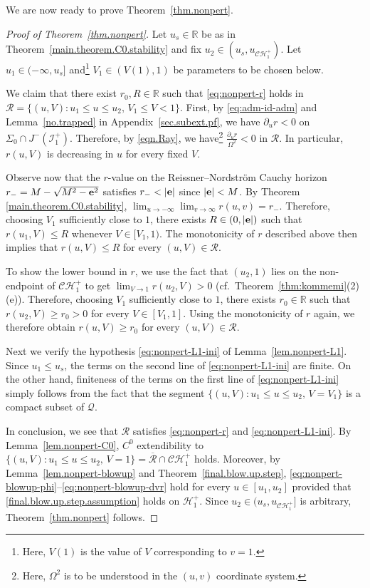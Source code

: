 \documentclass[10pt, reqno]{amsart}
\theoremstyle{definition}
\theoremstyle{remark}
\numberwithin{equation}{section}
\newcommand{\set}[1]{\{#1\}}
\newcommand{\rd}{\partial}
\newcommand{\0}{\emptyset}
\newcommand{\Omg}{\Omega}
\newcommand{\bbR}{\mathbb R}
\newcommand{\calC}{\mathcal C}
\newcommand{\calH}{\mathcal H}
\newcommand{\calQ}{\mathcal Q}
\newcommand{\calR}{\mathcal R}
\newcommand{\f}{\frac}
\newcommand{\CH}{\calC \calH^{+}}		%
\newcommand{\EH}{\calH^{+}}
\begin{document}
We are now ready to prove Theorem~\ref{thm.nonpert}.
\begin{proof}[Proof of Theorem~\ref{thm.nonpert}]
Let $u_{s} \in \bbR$ be as in Theorem~\ref{main.theorem.C0.stability} and fix $u_{2} \in (u_{s}, u_{\CH_{1}})$. Let $u_{1} \in (-\infty, u_{s}]$ and\footnote{Here, $V(1)$ is the value of $V$ corresponding to $v=1$.} $V_{1} \in (V(1), 1)$ be parameters to be chosen below. 

We claim that there exist $r_0, R\in \mathbb R$ such that \eqref{eq:nonpert-r} holds in $\mathcal R = \set{(u, V) : u_{1} \leq u \leq u_{2}, \, V_{1} \leq V < 1}$. First, by \eqref{eq:adm-id-adm} and Lemma~\ref{no.trapped} in Appendix~\ref{sec.subext.pf}, we have ${\rd_u r}<0$ on $\Sigma_0\cap J^-(\mathcal I^+_1)$. Therefore, by \eqref{eqn.Ray}, we have\footnote{Here, $\Omg^2$ is to be understood in the $(u,v)$ coordinate system.} $\f{\rd_u r}{\Omg^2}<0$ in $\mathcal R$. In particular, $r(u,V)$ is decreasing in $u$ for every fixed $V$. 

Observe now that the $r$-value on the Reissner--Nordstr\"om Cauchy horizon $r_-=M-\sqrt{M^2-{\bf e}^2}$ satisfies $r_-<|{\bf e}|$ since $|{\bf e}|<M$. 
By Theorem \ref{main.theorem.C0.stability}, $\lim_{u\to -\infty}\lim_{v\to \infty} r(u,v)= r_-$. Therefore, choosing $V_{1}$ sufficiently close to $1$, there exists $R\in (0,|{\bf e}|)$ such that $r(u_1,V)\leq R$ whenever $V \in [V_{1}, 1)$. The monotonicity of $r$ described above then implies that $r(u, V)\leq R$ for every $(u, V)\in \mathcal R$.

To show the lower bound in $r$, we use the fact that $(u_{2}, 1)$ lies on the non-endpoint of $\CH_{1}$ to get $\lim_{V \to 1} r(u_2,V)>0$ (cf.~Theorem~\ref{thm:kommemi}(2)(e)). Therefore, choosing $V_1$ sufficiently close to $1$, there exists $r_0 \in \mathbb R$ such that $r(u_2, V)\geq r_0 >0$ for every $V \in [V_1, 1]$. Using the monotonicity of $r$ again, we therefore obtain $r(u,V)\geq r_0$ for every $(u, V)\in \mathcal R$.

Next we verify the hypothesis \eqref{eq:nonpert-L1-ini} of Lemma~\ref{lem.nonpert-L1}. Since $u_{1} \leq u_{s}$, the terms on the second line of \eqref{eq:nonpert-L1-ini} are finite. On the other hand, finiteness of the terms on the first line of \eqref{eq:nonpert-L1-ini} simply follows from the fact that the segment $\set{(u, V) : u_{1} \leq u \leq u_{2}, \, V = V_{1}}$ is a compact subset of $\calQ$.

In conclusion, we see that $\calR$ satisfies \eqref{eq:nonpert-r} and \eqref{eq:nonpert-L1-ini}. By Lemma~\ref{lem.nonpert-C0}, $C^{0}$ extendibility to $\set{(u, V) : u_{1} \leq u \leq u_{2}, \, V = 1} = \overline{\calR} \cap \CH_{1}$ holds. Moreover, by Lemma~\ref{lem.nonpert-blowup} and Theorem~\ref{final.blow.up.step}, \eqref{eq:nonpert-blowup-phi}--\eqref{eq:nonpert-blowup-dvr} hold for every $u \in [u_{1}, u_{2}]$ provided that \eqref{final.blow.up.step.assumption} holds on $\EH_{1}$. Since $u_{2} \in (u_{s}, u_{\CH_{1}}]$ is arbitrary, Theorem~\ref{thm.nonpert} follows.
\end{proof}
\end{document}
